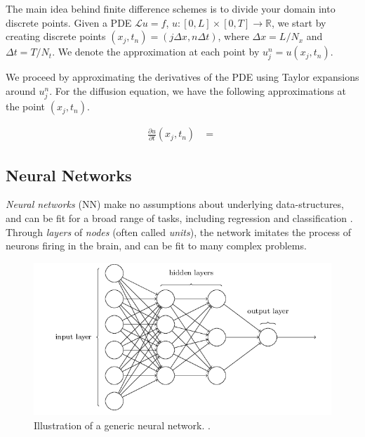 The main idea behind finite difference schemes is to divide your domain into discrete points.
Given a PDE $\mathcal{L}u=f$, $u : [0, L] \times [0, T] \to \mathbb{R}$, we start by creating discrete points $(x_j, t_n) = (j \Delta x, n\Delta t)$, where $\Delta x = L/N_x$ and $\Delta t = T/N_t$.
We denote the approximation at each point by $u_j^n = u(x_j, t_n)$.

We proceed by approximating the derivatives of the PDE using Taylor expansions around $u_j^n$.
For the diffusion equation, we have the following approximations at the point $(x_j, t_n)$.

\begin{align}
    \frac{\partial u}{\partial t}(x_j, t_n) &= \frac{}{}
\end{align}


\subsection{Neural Networks } 


\textit{Neural networks} (NN) make no assumptions about underlying data-structures, and can be fit for a broad range of tasks, including regression and classification \citep[Neural networks]{morten}. Through \textit{layers} of \textit{nodes} (often called \textit{units}), the network imitates the process of neurons firing in the brain, and can be fit to many complex problems.

\begin{figure}[H]
    \centering
    \includegraphics[width=1\linewidth]{project_2/figures/generic_NN.png}
    \caption{Illustration of a generic neural network. \cite[Taken from][Ch.1]{nielsen}.}
    \label{fig:NN}
\end{figure}

